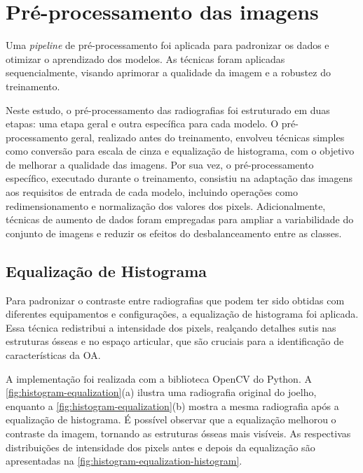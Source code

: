 \section{Pré-processamento das imagens}

Uma \textit{pipeline} de pré-processamento foi aplicada para padronizar os dados e otimizar o aprendizado dos modelos. As técnicas foram aplicadas sequencialmente, visando aprimorar a qualidade da imagem e a robustez do treinamento.

Neste estudo, o pré-processamento das radiografias foi estruturado em duas etapas: uma etapa geral e outra específica para cada modelo. O pré-processamento geral, realizado antes do treinamento, envolveu técnicas simples como conversão para escala de cinza e equalização de histograma, com o objetivo de melhorar a qualidade das imagens. Por sua vez, o pré-processamento específico, executado durante o treinamento, consistiu na adaptação das imagens aos requisitos de entrada de cada modelo, incluindo operações como redimensionamento e normalização dos valores dos pixels. Adicionalmente, técnicas de aumento de dados foram empregadas para ampliar a variabilidade do conjunto de imagens e reduzir os efeitos do desbalanceamento entre as classes.

\subsection{Equalização de Histograma}

Para padronizar o contraste entre radiografias que podem ter sido obtidas com diferentes equipamentos e configurações, a equalização de histograma foi aplicada. Essa técnica redistribui a intensidade dos pixels, realçando detalhes sutis nas estruturas ósseas e no espaço articular, que são cruciais para a identificação de características da OA.

A implementação foi realizada com a biblioteca OpenCV \citep{opencv} do Python. A \autoref{fig:histogram-equalization}(a) ilustra uma radiografia original do joelho, enquanto a \autoref{fig:histogram-equalization}(b) mostra a mesma radiografia após a equalização de histograma. É possível observar que a equalização melhorou o contraste da imagem, tornando as estruturas ósseas mais visíveis. As respectivas distribuições de intensidade dos pixels antes e depois da equalização são apresentadas na \autoref{fig:histogram-equalization-histogram}.

